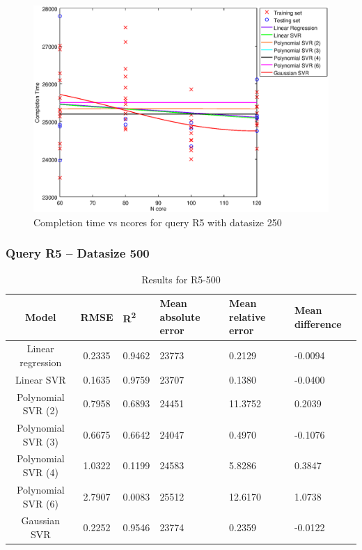 \documentclass[a4paper,11pt]{article}
\begin{document}
\begin {figure}[hbtp]
\centering
\includegraphics[width=\textwidth]{output/R5_250_LINEAR_NCORE/plot_R5_250.eps}
\caption{Completion time vs ncores for query R5 with datasize 250}
\label{fig:all_linear_R5_250}
\end {figure}

\newpage
\subsubsection{Query R5 -- Datasize 500}
\begin{table}[H]
	\centering
	\begin{adjustbox}{center}
		\begin{tabular}{c | c M{1.2cm} M{2.5cm} M{2.5cm} M{1.8cm}}
			Model & RMSE & R\textsuperscript{2} & Mean absolute error & Mean relative error & Mean difference \tabularnewline
			\hline
			Linear regression & 0.2335 & 0.9462 &  23773 & 0.2129 & -0.0094 \\
			Linear SVR & 0.1635 & 0.9759 &  23707 & 0.1380 & -0.0400 \\
			Polynomial SVR (2) & 0.7958 & 0.6893 &  24451 & 11.3752 & 0.2039 \\
			Polynomial SVR (3) & 0.6675 & 0.6642 &  24047 & 0.4970 & -0.1076 \\
			Polynomial SVR (4) & 1.0322 & 0.1199 &  24583 & 5.8286 & 0.3847 \\
			Polynomial SVR (6) & 2.7907 & 0.0083 &  25512 & 12.6170 & 1.0738 \\
			Gaussian SVR & 0.2252 & 0.9546 &  23774 & 0.2359 & -0.0122 \\
		\end{tabular}
	\end{adjustbox}
	\\
	\caption{Results for R5-500}
	\label{fig:all_linear_R5_500}
\end{table}
\end{document}
